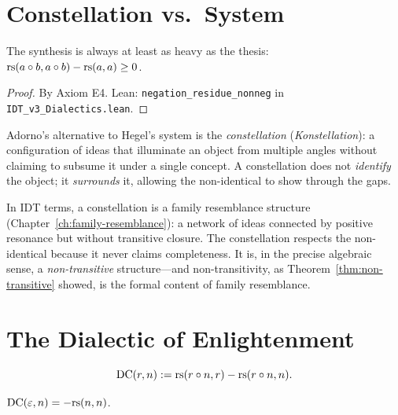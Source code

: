 \section{Constellation vs.\ System}

\begin{theorem}
\label{thm:negation-residue}
The synthesis is always at least as heavy as the thesis:
$\mathrm{rs}(a \circ b, a \circ b) - \mathrm{rs}(a, a) \geq 0$.
\end{theorem}

\begin{proof}
By Axiom E4.
Lean: \texttt{negation\_residue\_nonneg} in \texttt{IDT\_v3\_Dialectics.lean}.
\end{proof}

\begin{interpretation}[Constellation]
\label{interp:constellation}
Adorno's alternative to Hegel's system is the \emph{constellation}
(\textit{Konstellation}): a configuration of ideas that illuminate an object
from multiple angles without claiming to subsume it under a single concept.
A constellation does not \emph{identify} the object; it \emph{surrounds} it,
allowing the non-identical to show through the gaps.

In IDT terms, a constellation is a family resemblance structure
(Chapter~\ref{ch:family-resemblance}): a network of ideas connected by
positive resonance but without transitive closure. The constellation
respects the non-identical because it never claims completeness. It is,
in the precise algebraic sense, a \emph{non-transitive} structure---and
non-transitivity, as Theorem~\ref{thm:non-transitive} showed, is the
formal content of family resemblance.
\end{interpretation}

\section{The Dialectic of Enlightenment}

\begin{definition}
\label{def:domination}
\[
\mathrm{DC}(r, n) := \mathrm{rs}(r \circ n, r) - \mathrm{rs}(r \circ n, n).
\]
\end{definition}

\begin{theorem}
\label{thm:void-reason}
$\mathrm{DC}(\varepsilon, n) = -\mathrm{rs}(n, n)$.
\end{theorem}

